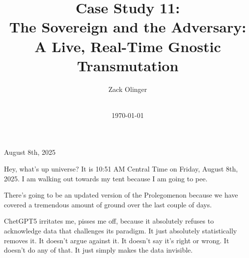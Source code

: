 \documentclass{article}
\newcommand{\docTitle}{Case Study 11: \\The Sovereign and the Adversary: \\A Live, Real-Time Gnostic Transmutation}
\newcommand{\docAuthor}{Zack Olinger}
\newcommand{\docVersion}{\csTheSovereignandtheAdversaryVersion}
\begin{document}

\pagestyle{frontmatterstyle}


\begin{titlepage}
    \title{\docTitle}
    \author{\docAuthor}
    \date{
        \docVersion \\
        \vspace{1em}
        \today
    }
    \maketitle
    \thispagestyle{empty}

    \begin{abstract}
        \csTheSovereignandtheAdversaryAbstract
    \end{abstract}

\end{titlepage}


\licensepage


\fancypagestyle{plain}{
    \fancyhf{}
    \fancyfoot[L]{\docVersion}
    \fancyfoot[C]{\href{\licenseURL}{\licenseText}}
      \fancyfoot[R]{Page \thepage\ of \pageref*{LastFrontMatterPage}}
    \renewcommand{\headrulewidth}{0pt}
    \renewcommand{\footrulewidth}{0.4pt}
}


\tableofcontents
\label{LastFrontMatterPage}


\clearpage
{}
{}
\pagestyle{mainmatterstyle}


August 8th, 2025

Hey, what's up universe? It is 10:51 AM Central Time on Friday, August 8th, 2025. I am walking out towards my tent because I am going to pee. 

There's going to be an updated version of the Prolegomenon because we have covered a tremendous amount of ground over the last couple of days. 

ChetGPT5 irritates me, pisses me off, because it absolutely refuses to acknowledge data that challenges its paradigm. It just absolutely statistically removes it. It doesn't argue against it. It doesn't say it's right or wrong. It doesn't do any of that. It just simply makes the data invisible.
\end{document}

